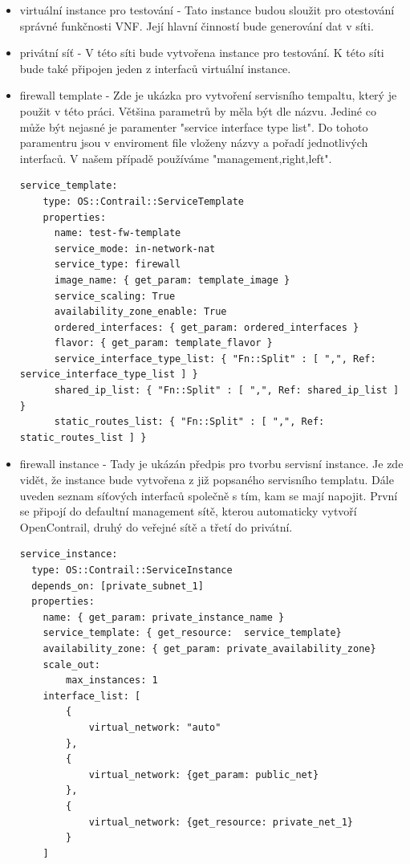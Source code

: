 \begin{itemize}

\item virtuální instance pro testování - Tato instance budou sloužit pro otestování správné funkčnosti VNF. Její hlavní činností bude generování dat v síti.

\item privátní síť - V této síti bude vytvořena instance pro testování. K této síti bude také připojen jeden z interfaců virtuální instance.

\item firewall template - Zde je ukázka pro vytvoření servisního tempaltu, který je použit v této práci. Většina parametrů by měla být dle názvu. Jediné co může být nejasné je paramenter "service interface type list". Do tohoto paramentru jsou v enviroment file vloženy názvy a pořadí jednotlivých interfaců. V našem případě používáme "management,right,left".

\begin{lstlisting}[caption=Servisní template]
service_template:
    type: OS::Contrail::ServiceTemplate
    properties:
      name: test-fw-template
      service_mode: in-network-nat
      service_type: firewall
      image_name: { get_param: template_image }
      service_scaling: True
      availability_zone_enable: True
      ordered_interfaces: { get_param: ordered_interfaces }
      flavor: { get_param: template_flavor }
      service_interface_type_list: { "Fn::Split" : [ ",", Ref: service_interface_type_list ] }
      shared_ip_list: { "Fn::Split" : [ ",", Ref: shared_ip_list ] }
      static_routes_list: { "Fn::Split" : [ ",", Ref: static_routes_list ] }
\end{lstlisting}

\item firewall instance - Tady je ukázán předpis pro tvorbu servisní instance. Je zde vidět, že instance bude vytvořena z již popsaného servisního templatu. Dále uveden seznam síťových interfaců společně s tím, kam se mají napojit. První se připojí do defaultní management sítě, kterou automaticky vytvoří OpenContrail, druhý do veřejné sítě a třetí do privátní.

\begin{lstlisting}[caption=Servisní instance]
service_instance:
  type: OS::Contrail::ServiceInstance
  depends_on: [private_subnet_1]
  properties:
    name: { get_param: private_instance_name }
    service_template: { get_resource:  service_template}
    availability_zone: { get_param: private_availability_zone}
    scale_out: 
        max_instances: 1
    interface_list: [
        {
            virtual_network: "auto"
        },
        {
            virtual_network: {get_param: public_net}
        },
        {
            virtual_network: {get_resource: private_net_1}
        }
    ]
\end{lstlisting}


\end{itemize}
